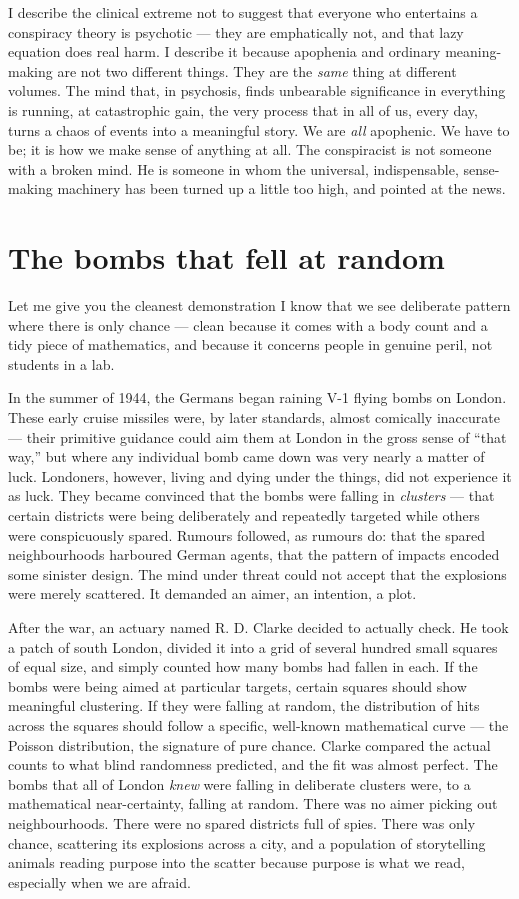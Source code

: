 I describe the clinical extreme not to suggest that everyone who entertains a conspiracy theory is psychotic — they are emphatically not, and that lazy equation does real harm. I describe it because apophenia and ordinary meaning-making are not two different things. They are the \emph{same} thing at different volumes. The mind that, in psychosis, finds unbearable significance in everything is running, at catastrophic gain, the very process that in all of us, every day, turns a chaos of events into a meaningful story. We are \emph{all} apophenic. We have to be; it is how we make sense of anything at all. The conspiracist is not someone with a broken mind. He is someone in whom the universal, indispensable, sense-making machinery has been turned up a little too high, and pointed at the news.

\section*{The bombs that fell at random}

Let me give you the cleanest demonstration I know that we see deliberate pattern where there is only chance — clean because it comes with a body count and a tidy piece of mathematics, and because it concerns people in genuine peril, not students in a lab.

In the summer of 1944, the Germans began raining V-1 flying bombs on London. These early cruise missiles were, by later standards, almost comically inaccurate — their primitive guidance could aim them at London in the gross sense of ``that way,'' but where any individual bomb came down was very nearly a matter of luck. Londoners, however, living and dying under the things, did not experience it as luck. They became convinced that the bombs were falling in \emph{clusters} — that certain districts were being deliberately and repeatedly targeted while others were conspicuously spared. Rumours followed, as rumours do: that the spared neighbourhoods harboured German agents, that the pattern of impacts encoded some sinister design. The mind under threat could not accept that the explosions were merely scattered. It demanded an aimer, an intention, a plot.

After the war, an actuary named R. D. Clarke decided to actually check. He took a patch of south London, divided it into a grid of several hundred small squares of equal size, and simply counted how many bombs had fallen in each. If the bombs were being aimed at particular targets, certain squares should show meaningful clustering. If they were falling at random, the distribution of hits across the squares should follow a specific, well-known mathematical curve — the Poisson distribution, the signature of pure chance. Clarke compared the actual counts to what blind randomness predicted, and the fit was almost perfect. The bombs that all of London \emph{knew} were falling in deliberate clusters were, to a mathematical near-certainty, falling at random. There was no aimer picking out neighbourhoods. There were no spared districts full of spies. There was only chance, scattering its explosions across a city, and a population of storytelling animals reading purpose into the scatter because purpose is what we read, especially when we are afraid.


